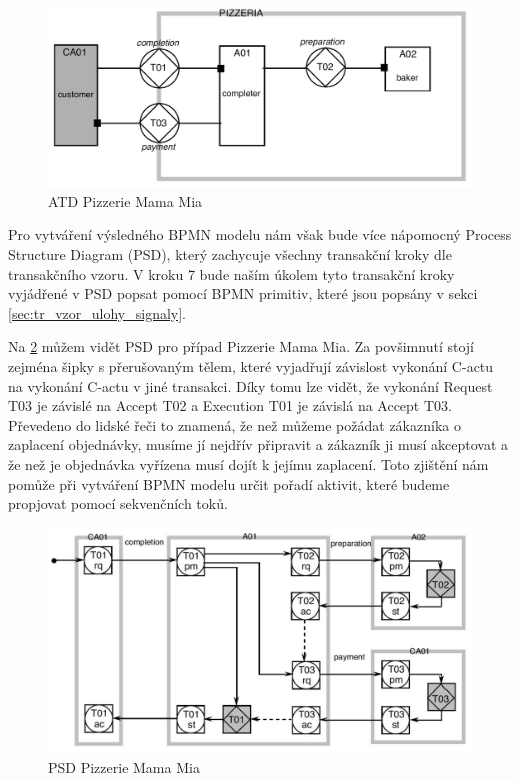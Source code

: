 \documentclass[]{article}
\begin{document}
\begin{figure}[H]\centering
\includegraphics[scale=0.35]{obrazky/ATD-pizzeria}
\caption{ATD Pizzerie Mama Mia \cite{Dietz2006}}
\label{fig:atd_pizzeria}
\end{figure}

Pro vytváření výsledného BPMN modelu nám však bude více nápomocný Process Structure Diagram (PSD), který zachycuje všechny transakční kroky dle transakčního vzoru. V kroku 7 bude naším úkolem tyto transakční kroky vyjádřené v PSD popsat pomocí BPMN primitiv, které jsou popsány v sekci \ref{sec:tr_vzor_ulohy_signaly}.

Na \ref{fig:psd_pizzeria} můžem vidět PSD pro případ Pizzerie Mama Mia. Za povšimnutí stojí zejména šipky s přerušovaným tělem, které vyjadřují závislost vykonání C-actu na vykonání C-actu v jiné transakci. Díky tomu lze vidět, že vykonání Request T03 je závislé na Accept T02 a Execution T01 je závislá na Accept T03. Převedeno do lidské řeči to znamená, že než můžeme požádat zákazníka o zaplacení objednávky, musíme jí nejdřív připravit a zákazník ji musí akceptovat a že než je objednávka vyřízena musí dojít k jejímu zaplacení. Toto zjištění nám pomůže při vytváření BPMN modelu určit pořadí aktivit, které budeme propjovat pomocí sekvenčních toků.

\begin{figure}[H]\centering
\includegraphics[scale=0.35]{obrazky/PSD-pizzeria}
\caption{PSD Pizzerie Mama Mia \cite{Dietz2006}}
\label{fig:psd_pizzeria}
\end{figure}
\end{document}
